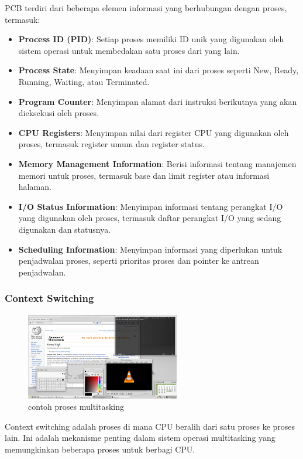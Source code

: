 \documentclass[12pt]{article}
\begin{document}
PCB terdiri dari beberapa elemen informasi yang berhubungan dengan proses, termasuk:
\begin{itemize}
\item \textbf{Process ID (PID)}: Setiap proses memiliki ID unik yang digunakan oleh sistem operasi untuk membedakan satu proses dari yang lain.
\item \textbf{Process State}: Menyimpan keadaan saat ini dari proses seperti New, Ready, Running, Waiting, atau Terminated.
\item \textbf{Program Counter}: Menyimpan alamat dari instruksi berikutnya yang akan dieksekusi oleh proses.
\item \textbf{CPU Registers}: Menyimpan nilai dari register CPU yang digunakan oleh proses, termasuk register umum dan register status.
\item \textbf{Memory Management Information}: Berisi informasi tentang manajemen memori untuk proses, termasuk base dan limit register atau informasi halaman.
\item \textbf{I/O Status Information}: Menyimpan informasi tentang perangkat I/O yang digunakan oleh proses, termasuk daftar perangkat I/O yang sedang digunakan dan statusnya.
\item \textbf{Scheduling Information}: Menyimpan informasi yang diperlukan untuk penjadwalan proses, seperti prioritas proses dan pointer ke antrean penjadwalan.
\end{itemize}

\subsubsection{Context Switching}
\begin{figure}[h]
\centering
\includegraphics[width=0.6\textwidth]{asset/gambar_multitasking.png}
\caption{contoh proses multitasking}
\end{figure}

Context switching adalah proses di mana CPU beralih dari satu proses ke proses lain. Ini adalah mekanisme penting dalam sistem operasi multitasking yang memungkinkan beberapa proses untuk berbagi CPU.
\end{document}
